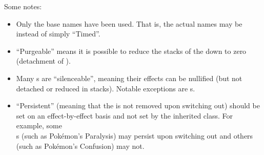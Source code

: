 
\vspace*{1em}

Some notes:

\begin{itemize}
	\item{Only the base names have been used. That is, the actual names may be\\  instead of simply ``Timed''.}
	\item{``Purgeable'' means it is possible to reduce the stacks of the  down to zero (detachment of ).}
	\item{Many s are ``silenceable'', meaning their effects can be nullified (but not detached or reduced in stacks). Notable exceptions are s.}
	\item{``Persistent'' (meaning that the  is not removed upon switching out) should be set on an effect-by-effect basis and not set by the inherited class. For example, some\\s (such as Pok\'{e}mon's Paralysis) may persist upon switching out and others (such as Pok\'{e}mon's Confusion) may not.}
\end{itemize}


\postamble{}